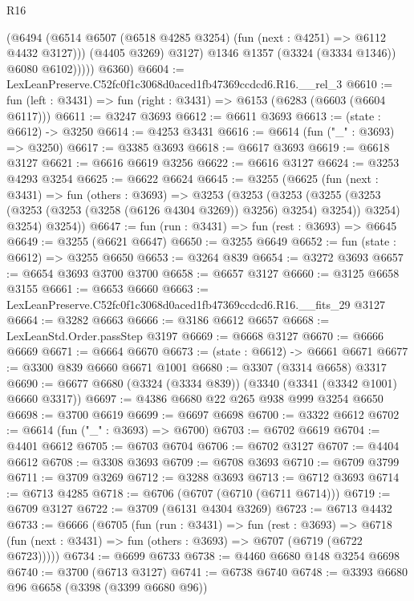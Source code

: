 \begin{lexlean}{R16}
\begin{coremodule}
                  (@6494
                    (@6514 @6507 (@6518 @4285 @3254) (fun (next : @4251) => @6112 @4432 @3127)))
                  (@4405 @3269)
                  @3127)
                @1346
                @1357
                (@3324 (@3334 @1346))
                @6080
                @6102)))))
      @6360)
@6604 := LexLeanPreserve.C52fc0f1c3068d0aced1fb47369ccdcd6.R16.__rel_3
@6610 := fun (left : @3431) => fun (right : @3431) => @6153 (@6283 (@6603 (@6604 @6117)))
@6611 := @3247 @3693
@6612 := @6611 @3693
@6613 := (state : @6612) -> @3250
@6614 := @4253 @3431
@6616 := @6614 (fun ("_" : @3693) => @3250)
@6617 := @3385 @3693
@6618 := @6617 @3693
@6619 := @6618 @3127
@6621 := @6616 @6619 @3256
@6622 := @6616 @3127
@6624 := @3253 @4293 @3254
@6625 := @6622 @6624
@6645 := @3255
    (@6625
      (fun (next : @3431) =>
      fun (others : @3693) =>
      @3253
        (@3253
          (@3253
            (@3255 (@3253 (@3253 (@3253 (@3258 (@6126 @4304 @3269)) @3256) @3254) @3254))
            @3254)
          @3254)
        @3254))
@6647 := fun (run : @3431) => fun (rest : @3693) => @6645
@6649 := @3255 (@6621 @6647)
@6650 := @3255 @6649
@6652 := fun (state : @6612) => @3255 @6650
@6653 := @3264 @839
@6654 := @3272 @3693
@6657 := @6654 @3693 @3700 @3700
@6658 := @6657 @3127
@6660 := @3125 @6658 @3155
@6661 := @6653 @6660
@6663 := LexLeanPreserve.C52fc0f1c3068d0aced1fb47369ccdcd6.R16.__fits_29 @3127
@6664 := @3282 @6663
@6666 := @3186 @6612 @6657
@6668 := LexLeanStd.Order.passStep @3197
@6669 := @6668 @3127
@6670 := @6666 @6669
@6671 := @6664 @6670
@6673 := (state : @6612) -> @6661 @6671
@6677 := @3300 @839 @6660 @6671 @1001
@6680 := @3307 (@3314 @6658) @3317
@6690 := @6677 @6680 (@3324 (@3334 @839)) (@3340 (@3341 (@3342 @1001) @6660 @3317))
@6697 := @4386 @6680 @22 @265 @938 @999 @3254 @6650
@6698 := @3700 @6619
@6699 := @6697 @6698
@6700 := @3322 @6612
@6702 := @6614 (fun ("_" : @3693) => @6700)
@6703 := @6702 @6619
@6704 := @4401 @6612
@6705 := @6703 @6704
@6706 := @6702 @3127
@6707 := @4404 @6612
@6708 := @3308 @3693
@6709 := @6708 @3693
@6710 := @6709 @3799
@6711 := @3709 @3269
@6712 := @3288 @3693
@6713 := @6712 @3693
@6714 := @6713 @4285
@6718 := @6706 (@6707 (@6710 (@6711 @6714)))
@6719 := @6709 @3127
@6722 := @3709 (@6131 @4304 @3269)
@6723 := @6713 @4432
@6733 := @6666
    (@6705
      (fun (run : @3431) =>
      fun (rest : @3693) =>
      @6718 (fun (next : @3431) => fun (others : @3693) => @6707 (@6719 (@6722 @6723)))))
@6734 := @6699 @6733
@6738 := @4460 @6680 @148 @3254 @6698
@6740 := @3700 (@6713 @3127)
@6741 := @6738 @6740
@6748 := @3393 @6680 @96 @6658 (@3398 (@3399 @6680 @96))

\end{coremodule}
\end{lexlean}
